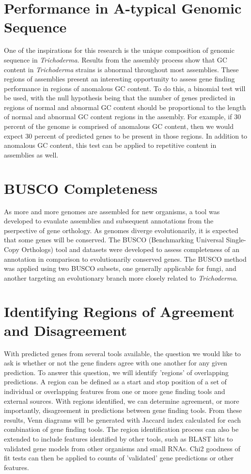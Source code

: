 \section{Performance in A-typical Genomic Sequence}

One of the inspirations for this research is the unique composition of
genomic sequence in \textit{Trichoderma}. Results from the assembly
process show that GC content in \textit{Trichoderma} strains is
abnormal throughout most assemblies. These regions of assemblies
present an interesting opportunity to assess gene finding performance
in regions of anomalous GC content. To do this, a binomial test will
be used, with the null hypothesis being that the number of genes
predicted in regions of normal and abnormal GC content should be
proportional to the length of normal and abnormal GC content regions
in the assembly. For example, if 30 percent of the genome is comprised
of anomalous GC content, then we would expect 30 percent of predicted
genes to be present in those regions. In addition to anomalous GC
content, this test can be applied to repetitive content in assemblies
as well.

\section{BUSCO Completeness}

As more and more genomes are assembled for new organisms, a tool was
developed to evaulate assemblies and subsequent annotations from the
pserpective of gene orthology. As genomes diverge evolutionarily, it
is expected that some genes will be conserved. The BUSCO (Benchmarking
Universal Single-Copy Orthologs) tool and datasets were developed to
assess completeness of an annotation in comparison to evolutionarily
conserved genes. The BUSCO method was applied using two BUSCO subsets,
one generally applicable for fungi, and another targeting an
evolutionary branch more closely related to \textit{Trichoderma}.


\section{Identifying Regions of Agreement and Disagreement}

With predicted genes from several tools available, the question we
would like to ask is whether or not the gene finders agree with one
another for any given prediction. To answer this question, we will
identify 'regions' of overlapping predictions. A region can be defined
as a start and stop position of a set of individual or overlapping
features from one or more gene finding tools and external
sources. With regions identified, we can determine agreement, or more
importantly, disagreement in predictions between gene finding
tools. From these results, Venn diagrams will be generated with
Jaccard index calculated for each combination of gene finding
tools. The region identification process can also be extended to
include features identified by other tools, such as BLAST hits to
validated gene models from other organisms and small RNAs. Chi2
goodness of fit tests can then be applied to counts of 'validated'
gene predictions or other features.
